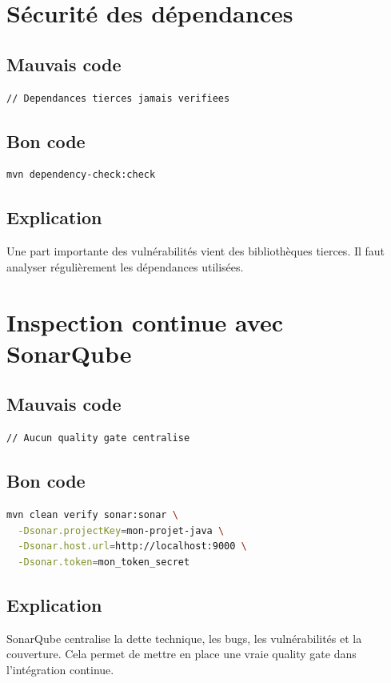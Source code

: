 \documentclass[a4paper,11pt]{report}
\begin{document}
\chapter{Sécurité des dépendances}

\section{Mauvais code}
\begin{lstlisting}
// Dependances tierces jamais verifiees
\end{lstlisting}

\section{Bon code}
\begin{lstlisting}[language=bash]
mvn dependency-check:check
\end{lstlisting}

\section{Explication}
Une part importante des vulnérabilités vient des bibliothèques tierces.
Il faut analyser régulièrement les dépendances utilisées.

\chapter{Inspection continue avec SonarQube}

\section{Mauvais code}
\begin{lstlisting}
// Aucun quality gate centralise
\end{lstlisting}

\section{Bon code}
\begin{lstlisting}[language=bash]
mvn clean verify sonar:sonar \
  -Dsonar.projectKey=mon-projet-java \
  -Dsonar.host.url=http://localhost:9000 \
  -Dsonar.token=mon_token_secret
\end{lstlisting}

\section{Explication}
SonarQube centralise la dette technique, les bugs, les vulnérabilités et la couverture.
Cela permet de mettre en place une vraie quality gate dans l'intégration continue.
\end{document}
